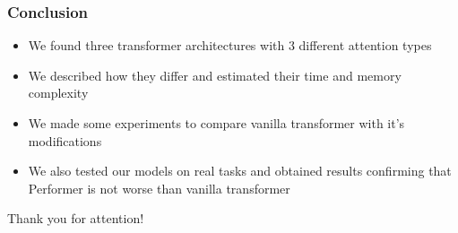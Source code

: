 \documentclass[9pt]{beamer}%
\begin{document}
\begin{frame}
	\frametitle{Conclusion}
	
	\begin{itemize}
		\item We found three transformer architectures with 3 different attention types
		\item We described how they differ and estimated their time and memory complexity
		\item We made some experiments to compare vanilla transformer with it's modifications
		\item We also tested our models on real tasks and obtained results confirming that Performer is not worse than vanilla transformer
	\end{itemize}
	
\end{frame}

\begin{frame}
	
	\huge{Thank you for attention!}
	
\end{frame}
\end{document}

